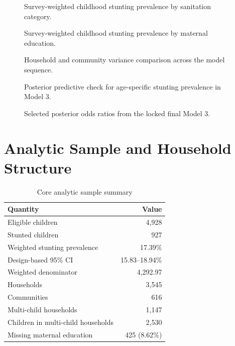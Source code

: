 \begin{figure}[H]
\centering

\caption{Survey-weighted childhood stunting prevalence by sanitation category.}
\end{figure}

\begin{figure}[H]
\centering

\caption{Survey-weighted childhood stunting prevalence by maternal education.}
\end{figure}

\begin{figure}[H]
\centering

\caption{Household and community variance comparison across the model sequence.}
\end{figure}

\begin{figure}[H]
\centering

\caption{Posterior predictive check for age-specific stunting prevalence in Model 3.}
\end{figure}

\begin{figure}[H]
\centering

\caption{Selected posterior odds ratios from the locked final Model 3.}
\end{figure}

\section{Analytic Sample and Household Structure}

\begin{table}[H]
\centering
\caption{Core analytic sample summary}
\begin{tabular}{lr}
\toprule
Quantity & Value \\
\midrule
Eligible children & 4,928 \\
Stunted children & 927 \\
Weighted stunting prevalence & 17.39\% \\
Design-based 95\% CI & 15.83--18.94\% \\
Weighted denominator & 4,292.97 \\
Households & 3,545 \\
Communities & 616 \\
Multi-child households & 1,147 \\
Children in multi-child households & 2,530 \\
Missing maternal education & 425 (8.62\%) \\
\bottomrule
\end{tabular}
\end{table}

